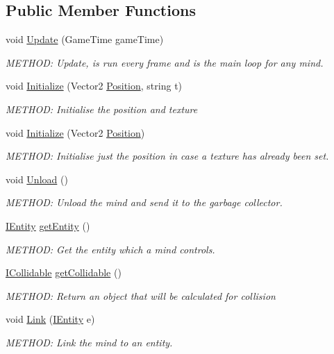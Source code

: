 \subsection*{Public Member Functions}
\begin{DoxyCompactItemize}
\item 
void \hyperlink{a00446_a21a0486019d7c7b665fdf483626323f3}{Update} (Game\+Time game\+Time)
\begin{DoxyCompactList}\small\item\em M\+E\+T\+H\+OD\+: Update, is run every frame and is the main loop for any mind. \end{DoxyCompactList}\item 
void \hyperlink{a00446_a6f51a819769ba43f5f1702563293aacd}{Initialize} (Vector2 \hyperlink{a00446_ad1af5071b566a62b9e64aad821da9f21}{Position}, string t)
\begin{DoxyCompactList}\small\item\em M\+E\+T\+H\+OD\+: Initialise the position and texture \end{DoxyCompactList}\item 
void \hyperlink{a00446_a421d8eb0a0accda3320144fbfe33ea8c}{Initialize} (Vector2 \hyperlink{a00446_ad1af5071b566a62b9e64aad821da9f21}{Position})
\begin{DoxyCompactList}\small\item\em M\+E\+T\+H\+OD\+: Initialise just the position in case a texture has already been set. \end{DoxyCompactList}\item 
void \hyperlink{a00446_a142493645e36a3e14c7d3c59793c4d3c}{Unload} ()
\begin{DoxyCompactList}\small\item\em M\+E\+T\+H\+OD\+: Unload the mind and send it to the garbage collector. \end{DoxyCompactList}\item 
\hyperlink{a00438}{I\+Entity} \hyperlink{a00446_af7c7cac5148930a12a85ec64412ac6f2}{get\+Entity} ()
\begin{DoxyCompactList}\small\item\em M\+E\+T\+H\+OD\+: Get the entity which a mind controls. \end{DoxyCompactList}\item 
\hyperlink{a00426}{I\+Collidable} \hyperlink{a00446_a3cbff0e85b710a4c8737254ed9ca7b30}{get\+Collidable} ()
\begin{DoxyCompactList}\small\item\em M\+E\+T\+H\+OD\+: Return an object that will be calculated for collision \end{DoxyCompactList}\item 
void \hyperlink{a00446_a9d8370ad6e1b2a07760d3554b1e179fd}{Link} (\hyperlink{a00438}{I\+Entity} e)
\begin{DoxyCompactList}\small\item\em M\+E\+T\+H\+OD\+: Link the mind to an entity. \end{DoxyCompactList}\end{DoxyCompactItemize}
